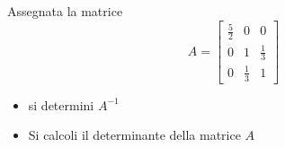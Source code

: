  Assegnata la matrice
\[
A=\left[ \begin{array}{ccc}
\frac{5}{2} & 0 & 0 \\
0 & 1 & \frac{1}{3} \\
0 & \frac{1}{3} & 1 \end{array} \right]
\]
\begin{itemize}
\item
si determini $A^{-1}$
\item Si calcoli il determinante della matrice $A$
\end{itemize}
